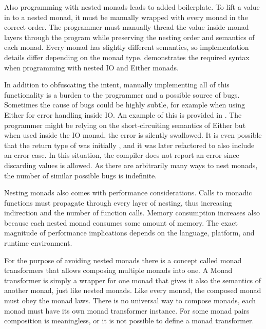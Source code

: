 Also programming with nested monads leads to added boilerplate. To lift a value in to a nested monad, it must be manually wrapped with every monad in the correct order. The programmer must manually thread the value inside monad layers through the program while preserving the nesting order and semantics of each monad. Every monad has slightly different semantics, so implementation details differ depending on the monad type.  demonstrates the required syntax when programming with nested IO and Either monads.



In addition to obfuscating the intent, manually implementing all of this functionality is a burden to the programmer and a possible source of bugs. Sometimes the cause of bugs could be highly subtle, for example when using Either for error handling inside IO. An example of this is provided in . The programmer might be relying on the short-circuiting semantics of Either but when used inside the IO monad, the error is silently swallowed. It is even possible that the return type of  was initially , and it was later refactored to also include an error case. In this situation, the compiler does not report an error since discarding values is allowed. As there are arbitrarily many ways to nest monads, the number of similar possible bugs is indefinite.



Nesting monads also comes with performance considerations. Calls to monadic functions must propagate through every layer of nesting, thus increasing indirection and the number of function calls. Memory consumption increases also because each nested monad consumes some amount of memory. The exact magnitude of performance implications depends on the language, platform, and runtime environment.



For the purpose of avoiding nested monads there is a concept called monad transformers that allows composing multiple monads into one. A Monad transformer is simply a wrapper for one monad that gives it also the semantics of another monad, just like nested monads. Like every monad, the composed monad must obey the monad laws. There is no universal way to compose monads, each monad must have its own monad transformer instance. For some monad pairs composition is meaningless, or it is not possible to define a monad transformer.

